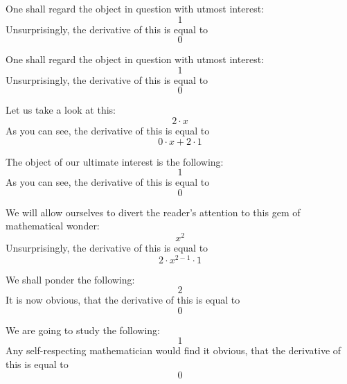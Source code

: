 \documentclass{article}
\begin{document}
One shall regard the object in question with utmost interest:
\begin{equation}
1 
\end{equation}
Unsurprisingly, the derivative of this is equal to
\begin{equation}
0 
\end{equation}

One shall regard the object in question with utmost interest:
\begin{equation}
1 
\end{equation}
Unsurprisingly, the derivative of this is equal to
\begin{equation}
0 
\end{equation}

Let us take a look at this:
\begin{equation}
2 \cdot x 
\end{equation}
As you can see, the derivative of this is equal to
\begin{equation}
0 \cdot x + 2 \cdot 1 
\end{equation}

The object of our ultimate interest is the following:
\begin{equation}
1 
\end{equation}
As you can see, the derivative of this is equal to
\begin{equation}
0 
\end{equation}

We will allow ourselves to divert the reader's attention to this gem of mathematical wonder:
\begin{equation}
x ^{2 } 
\end{equation}
Unsurprisingly, the derivative of this is equal to
\begin{equation}
2 \cdot x ^{2 - 1 } \cdot 1 
\end{equation}

We shall ponder the following:
\begin{equation}
2 
\end{equation}
It is now obvious, that the derivative of this is equal to
\begin{equation}
0 
\end{equation}

We are going to study the following:
\begin{equation}
1 
\end{equation}
Any self-respecting mathematician would find it obvious, that the derivative of this is equal to
\begin{equation}
0 
\end{equation}
\end{document}
